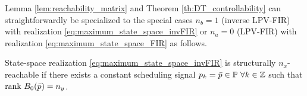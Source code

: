 Lemma \ref{lem:reachability_matrix} and Theorem \ref{th:DT_controllability} can straightforwardly be specialized to the special cases $n_b=1$ (inverse LPV-FIR) with realization \eqref{eq:maximum_state_space_invFIR} or $n_a=0$ (LPV-FIR) with realization \eqref{eq:maximum_state_space_FIR} as follows. 
\begin{corollary}\label{cor:reachability_invFIR}
    State-space realization \eqref{eq:maximum_state_space_invFIR} is structurally $n_x$-reachable if there exists a constant scheduling signal $p_k = \bar{p} \in\mathbb{P}\ \forall k\in\mathbb{Z}$ such that $\textrm{rank}\ B_0(\bar{p}) = n_y$.
\end{corollary}
